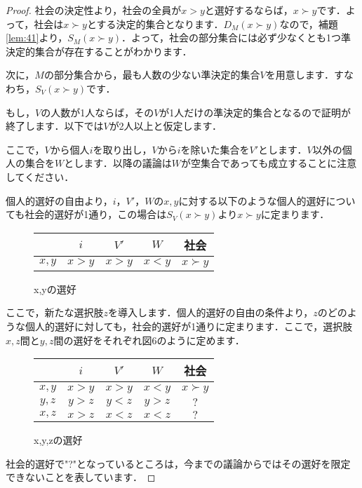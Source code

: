 \begin{proof}
社会の決定性より，社会の全員が$x > y$と選好するならば，$x \succ y$です．よって，社会は$x \succ y$とする決定的集合となります．$D_M(x \succ y)$なので，補題\ref{lem:41}より，$S_M(x \succ y)$．よって，社会の部分集合には必ず少なくとも1つ準決定的集合が存在することがわかります．

次に，$M$の部分集合から，最も人数の少ない準決定的集合$V$を用意します．すなわち，$S_V(x \succ y)$です．

もし，$V$の人数が1人ならば，その$V$が1人だけの準決定的集合となるので証明が終了します．以下では$V$が2人以上と仮定します．

ここで，$V$から個人$i$を取り出し，$V$から$i$を除いた集合を$V'$とします．$V$以外の個人の集合を$W$とします．以降の議論は$W$が空集合であっても成立することに注意してください．

個人的選好の自由より，$i$，$V'$，$W$の$x,y$に対する以下のような個人的選好についても社会的選好が1通り，この場合は$S_V(x \succ y)$より$x \succ y$に定まります．

\begin{figure}[!h]
    \centering
    \begin{tabular}{|c|c|c|c|c|} \hline
        & $i$ & $V'$ & $W$ & 社会 \\ \hline
        $x,y$ & $x > y$ & $x > y$ & $x < y$ & $x \succ y$ \\ \hline
    \end{tabular}
    \caption{x,yの選好}
\end{figure}

ここで，新たな選択肢$z$を導入します．個人的選好の自由の条件より，$z$のどのような個人的選好に対しても，社会的選好が1通りに定まります．ここで，選択肢$x,z$間と$y,z$間の選好をそれぞれ図6のように定めます．

\begin{figure}[!h]
    \centering
    \begin{tabular}{|c|c|c|c|c|} \hline
        & $i$ & $V'$ & $W$ & 社会 \\ \hline
        $x,y$ & $x > y$ & $x > y$ & $x < y$ & $x \succ y$ \\ \hline
        $y,z$ & $y > z$ & $y < z$ & $y > z$ & $ ? $ \\ \hline
        $x,z$ & $x > z$ & $x < z$ & $x < z$ & $ ? $ \\ \hline
    \end{tabular}
    \caption{x,y,zの選好}
\end{figure}

社会的選好で"?"となっているところは，今までの議論からではその選好を限定できないことを表しています．


\end{proof}
